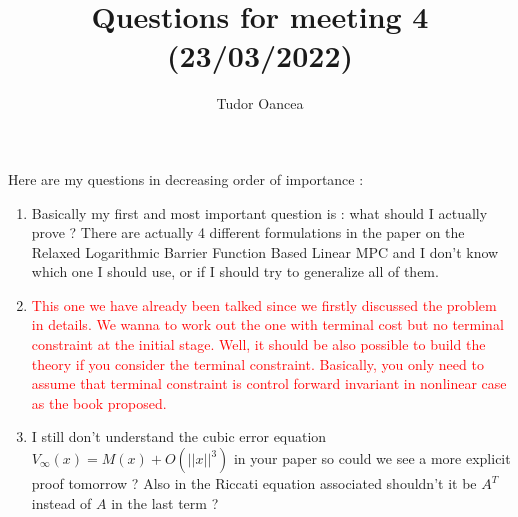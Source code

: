 \documentclass[12pt]{article}
\title{Questions for meeting 4 (23/03/2022)}
\author{Tudor Oancea}
\date{}
\numberwithin{theorem}{section} %
\theoremstyle{definition}
\theoremstyle{remark}
\begin{document}
\maketitle

\noindent Here are my questions in decreasing order of importance :
\begin{enumerate}
	\item 
	Basically my first and most important question is : what should I actually prove ?
	There are actually 4 different formulations in the paper on the Relaxed Logarithmic Barrier Function Based Linear MPC and I don't know which one I should use, or if I should try to generalize all of them.
	\item[] \textcolor{red}{This one we have already been talked since we firstly discussed the problem in details. We wanna to work out the one with terminal cost but no terminal constraint at the initial stage. Well, it should be also possible to build the theory if you consider the terminal constraint. Basically, you only need to assume that terminal constraint is control forward invariant in nonlinear case as the book proposed.}
	\item I still don't understand the cubic error equation $V_\infty(x)=M(x)+O(||x||^3)$ in your paper so could we see a more explicit proof tomorrow ? Also in the Riccati equation associated shouldn't it be $A^T$ instead of $A$ in the last term ?
	

\end{enumerate}
\end{document}
